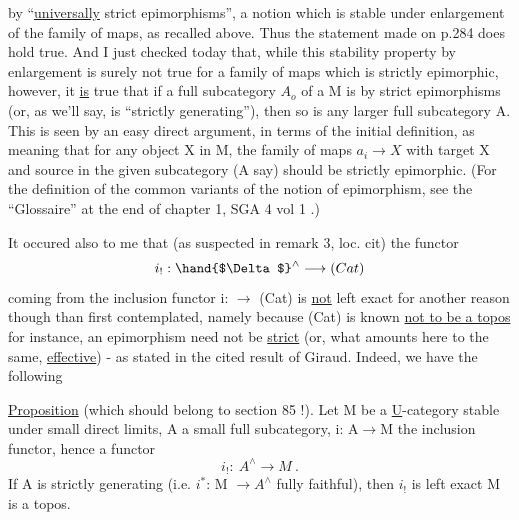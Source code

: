  by  ``\uline{universally} strict epimorphisms'',  a notion which
is stable under enlargement of the family of maps,  as recalled above.
Thus the statement made on p.284 does hold true.  And I just checked today
that,  while this stability property by enlargement is surely not  true
for a family of maps which is strictly epimorphic,  however,  it \uline{is}
true that if a full subcategory $A_o$ of a  M is  by
strict epimorphisms  (or,  as we'll say,  is ``strictly generating''),
then so is any larger full subcategory A.  This is seen by an easy direct
argument,  in terms of the initial definition,  as meaning that for any
object X in M,  the family of maps  $a_i \longrightarrow X$  with target X and source in
the given subcategory (A say) should be strictly epimorphic. (For the
definition of the  common variants  of the notion of epimorphism,
\margin{$\times$} see the ``Glossaire'' at the end of chapter 1,  SGA 4  vol 1 .)

It occured also to me that  (as suspected in remark 3,  loc. cit)
the functor
\[ i_{!} : \hand{$\Delta$}^{\wedge} \longrightarrow (Cat) \]
coming from the inclusion functor i: \hand{$\Delta$} $\to$ (Cat)  is \uline{not}  left exact\unsure{\deleted{,}}
\hand{(}for another reason though than first contemplated\hand{)}, namely because (Cat)
is known \uline{not to be a topos} \unsure{\deleted{,}}\hand{(}for instance,  an epimorphism need not
be \uline{strict} (or,  what amounts here to the same,  \uline{effective}) -  as stated
in the cited result of Giraud\hand{)}. Indeed,  we have the following

\uline{Proposition} (which should belong to section 85 !).  Let M be a \underline{U}-category
stable under small direct limits,  A a small full subcategory,  i: A$\to$M
the inclusion functor,  hence a functor
\[ i_{!} :\ A^{\wedge} \longrightarrow M\ . \]
If A is strictly generating  (i.e.  $i^{*}$: M $\longrightarrow A^{\wedge}$ fully faithful),  then 
$i_{!}$  is left exact M is a topos.

